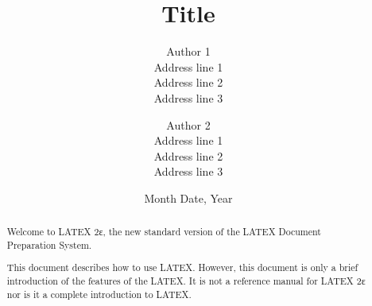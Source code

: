 \documentclass[12pt]{article}
\begin{document}
\title{Title}
\author{Author  1\\ 
Address  line  1\\
Address  line  2\\
Address  line  3
\and
Author  2\\
Address  line  1\\
Address  line  2\\
Address  line  3}
\date{Month Date, Year}
\maketitle
\begin{abstract}
Welcome to LATEX 2ε, the new standard version of the LATEX Document
Preparation System.

This document describes how to use LATEX.  However, this document is
only a brief introduction of the features of the LATEX.  It is not a reference
manual for LATEX 2ε nor is it a complete introduction to LATEX.
\end{abstract}
\end{document}
